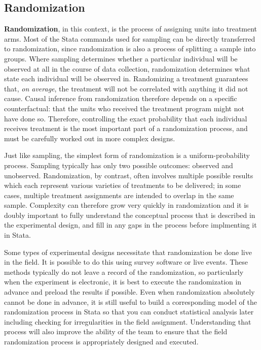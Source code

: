 \subsection{Randomization}

\textbf{Randomization}, in this context, is the process of assigning units into treatment arms.
Most of the Stata commands used for sampling can be directly transferred to randomization,
since randomization is also a process of splitting a sample into groups.
Where sampling determines whether a particular individual
will be observed at all in the course of data collection,
randomization determines what state each individual will be observed in.
Randomizing a treatment guarantees that, \textit{on average},
the treatment will not be correlated with anything it did not cause.\cite{duflo2007using}
Causal inference from randomization therefore depends on a specific counterfactual:
that the units who received the treatment program might not have done so.
Therefore, controlling the exact probability that each individual receives treatment
is the most important part of a randomization process,
and must be carefully worked out in more complex designs.

Just like sampling, the simplest form of randomization is a uniform-probability process.
Sampling typically has only two possible outcomes: observed and unobserved.
Randomization, by contrast, often involves multiple possible results
which each represent various varieties of treatments to be delivered;
in some cases, multiple treatment assignments are intended to overlap in the same sample.
Complexity can therefore grow very quickly in randomization
and it is doubly important to fully understand the conceptual process
that is described in the experimental design,
and fill in any gaps in the process before implmenting it in Stata.

Some types of experimental designs necessitate that randomization be done live in the field.
It is possible to do this using survey software or live events.
These methods typically do not leave a record of the randomization,
so particularly when the experiment is electronic,
it is best to execute the randomization in advance and preload the results if possible.
Even when randomization absolutely cannot be done in advance, it is still useful
to build a corresponding model of the randomization process in Stata
so that you can conduct statistical analysis later
including checking for irregularities in the field assignment.
Understanding that process will also improve the ability of the team
to ensure that the field randomization process is appropriately designed and executed.

